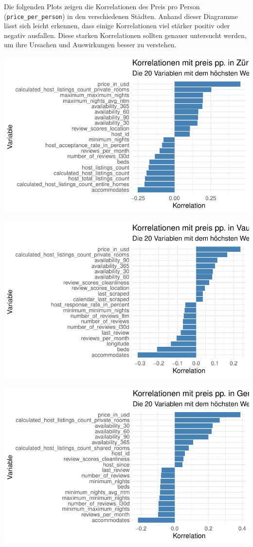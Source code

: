 \documentclass[
  journal,
]{IEEEtran}%
\begin{document}
Die folgenden Plots zeigen die Korrelationen des Preis pro Person
(\texttt{price\_per\_person}) in den verschiedenen Städten. Anhand
dieser Diagramme lässt sich leicht erkennen, dass einige Korrelationen
viel stärker positiv oder negativ ausfallen. Diese starken Korrelationen
sollten genauer untersucht werden, um ihre Ursachen und Auswirkungen
besser zu verstehen.

\includegraphics{main_files/figure-pdf/unnamed-chunk-12-1.pdf}

\includegraphics{main_files/figure-pdf/unnamed-chunk-12-2.pdf}

\includegraphics{main_files/figure-pdf/unnamed-chunk-12-3.pdf}
\end{document}
